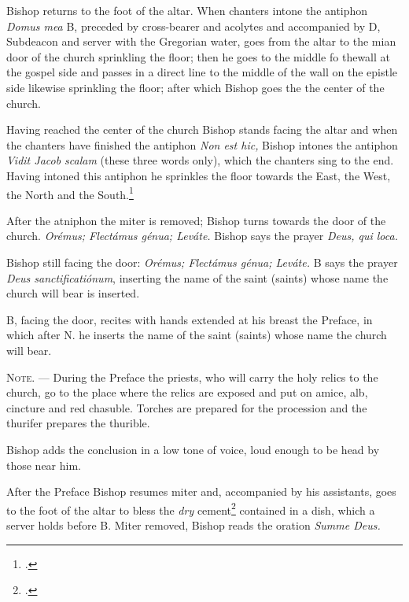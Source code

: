 \documentclass[letterpaper]{report}
\begin{document}
{\rubric Bishop returns to the foot of the altar. When chanters intone the antiphon
\textit{Domus mea} B, preceded by cross-bearer and acolytes and accompanied by D, Subdeacon and
server with the Gregorian water, goes from the altar to the mian door of the
church sprinkling the floor; then he goes to the middle fo thewall at the
gospel side and passes in a direct line to the middle of the wall on the
epistle side likewise sprinkling the floor; after which Bishop goes the the center
of the church.

\rubric Having reached the center of the church Bishop stands facing the altar and
when the chanters have finished the antiphon \textit{Non est hic,} Bishop intones
the antiphon \textit{Vidit Jacob scalam} (these three words only), which the
chanters sing to the end. Having intoned this antiphon he sprinkles the floor
towards the East, the West, the North and the South.\footcite[The Rubric in the
\textit{Pontificale Romanum} supposes the altar to be towards the East; the
bishop, therefore, sprinkles the floor before him, behind him, at his left and
than at his right.][footnote 1, p. 74.]{consecranda}

\rubric After the atniphon the miter is removed; Bishop turns towards the door of
the church. \textit{Orémus; Flectámus génua; Leváte.} Bishop says the prayer
\textit{Deus, qui loca.}

\rubric Bishop still facing the door: \textit{Orémus; Flectámus génua; Leváte.} B
says the prayer \textit{Deus sanctificatiónum}, inserting the name of the saint
(saints) whose name the church will bear is inserted.

\rubric B, facing the door, recites with hands extended at his breast the
Preface, in which after N. he inserts the name of the saint (saints) whose name
the church will bear.

\textsc{Note. ---} During the Preface the priests, who will carry the holy
relics to the church, go to the place where the relics are exposed and put on
amice, alb, cincture and red chasuble. Torches are prepared for the procession
and the thurifer prepares the thurible.

Bishop adds the conclusion in a low tone of voice, loud enough to be head by those
near him.

\rubric After the Preface Bishop resumes miter and, accompanied by his assistants,
goes to the foot of the altar to bless the \textit{dry} cement\footcite[The
Pontifical prescrives that he should first mix the cement with the water which
he previously blessed and then bless the mixture. This is not feasible and
consequently it is better to keep sufficient amount of water in a separate
vessel to be poured over the dry cement shortly before it is to be used for
closing the sepulchre.][footnote, p. 77.]{consecranda} contained in a dish,
which a server holds before B. Miter removed, Bishop reads the oration \textit{Summe
Deus.}

}
\end{document}
